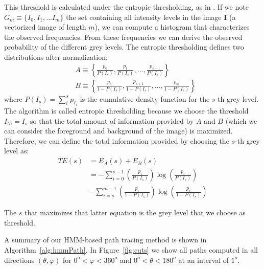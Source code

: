 This threshold is calculated under the entropic thresholding, as in \cite{Yen1995}. If we note $G_m \equiv \{I_0, I_1, ... I_m\} $ the set containing all intensity levels in the image $\mathbf{I}$ (a vectorized image of length $m$), we can compute a histogram that characterizes the observed frequencies. From these frequencies we can derive the observed probability of the different grey levels. The entropic thresholding defines two distributions after normalization: 
\begin{align}
& A \equiv \left\{\frac{p_0}{P(I_{s})}, \frac{p_1}{P(I_{s})}, \dots, \frac{p_{s-1}}{P(I_{s})} \right\}\\
& B \equiv \left\{\frac{p_{s}}{1-P(I_{s})}, \frac{p_{s+1}}{1-P(I_{s})}, \dots, \frac{p_m}{1-P(I_{s})} \right\}
\end{align}
where $P(I_s) = \sum_{i}^{s}p_{I_i}$ is the cumulative density function for the $s$-th grey level. The algorithm is called entropic thresholding because we choose the threshold $I_{th}=I_s$ so that the total amount of information provided by $A$ and $B$ (which we can consider the foreground and background of the image) is maximized. Therefore, we can define the total information provided by choosing the $s$-th grey level as: 
\begin{align}
TE(s) & = E_A(s) + E_B(s) \\
& = -\sum_{i=0}^{s-1}\left(\frac{p_i}{P(I_s)}\right)\log\left(\frac{p_i}{P(I_s)}\right) \\
& - \sum_{i=s}^{m-1}\left(\frac{p_i}{1-P(I_s)}\right)\log\left(\frac{p_i}{1-P(I_s)}\right)
\end{align}

The $s$ that maximizes that latter equation is the grey level that we choose as threshold. 

A summary of our \ac{HMM}-based path tracing method is shown in Algorithm~\ref{alg:hmmPath}. In Figure~\ref{fig:cuts} we show all paths computed in all directions $(\theta,\varphi)$ for $0^o<\varphi<360^o$ and $0^o<\theta<180^o$ at an interval of $1^o$. 

